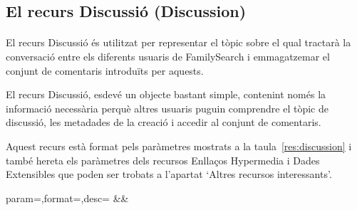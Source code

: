 \subsection{El recurs Discussió (Discussion)}

    \paragraph{}
    El recurs Discussió és utilitzat per representar el tòpic sobre el qual tractarà la conversació entre els diferents usuaris de FamilySearch i emmagatzemar el conjunt de comentaris introduïts per aquests.

    El recurs Discussió, esdevé un objecte bastant simple, contenint només la informació necessària perquè altres usuaris puguin comprendre el tòpic de discussió, les metadades de la creació i accedir al conjunt de comentaris.

    Aquest recurs està format pels paràmetres mostrats a la taula~\ref{res:discussion} i també hereta els paràmetres dels recursos Enllaços Hypermedia i Dades Extensibles que poden ser trobats a l'apartat `Altres recursos interessants'.

    \begin{center}
             {param=\param,format=\format,desc=\desc}
             {\param&\format&\desc}
     \end{center}
